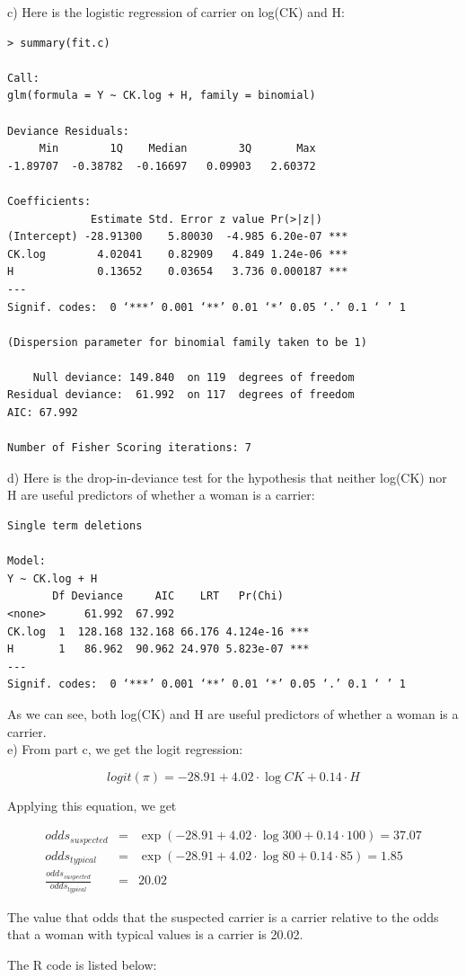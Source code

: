 \documentclass[12pt]{article}
\begin{document}
c) Here is the logistic regression of carrier on log(CK) and H:

\begin{verbatim}
> summary(fit.c)

Call:
glm(formula = Y ~ CK.log + H, family = binomial)

Deviance Residuals: 
     Min        1Q    Median        3Q       Max  
-1.89707  -0.38782  -0.16697   0.09903   2.60372  

Coefficients:
             Estimate Std. Error z value Pr(>|z|)    
(Intercept) -28.91300    5.80030  -4.985 6.20e-07 ***
CK.log        4.02041    0.82909   4.849 1.24e-06 ***
H             0.13652    0.03654   3.736 0.000187 ***
---
Signif. codes:  0 ‘***’ 0.001 ‘**’ 0.01 ‘*’ 0.05 ‘.’ 0.1 ‘ ’ 1 

(Dispersion parameter for binomial family taken to be 1)

    Null deviance: 149.840  on 119  degrees of freedom
Residual deviance:  61.992  on 117  degrees of freedom
AIC: 67.992

Number of Fisher Scoring iterations: 7
\end{verbatim}

d) Here is the drop-in-deviance test for the hypothesis that neither
log(CK) nor H are useful predictors of whether a woman is a carrier:

\begin{verbatim}
Single term deletions

Model:
Y ~ CK.log + H
       Df Deviance     AIC    LRT   Pr(Chi)    
<none>      61.992  67.992                     
CK.log  1  128.168 132.168 66.176 4.124e-16 ***
H       1   86.962  90.962 24.970 5.823e-07 ***
---
Signif. codes:  0 ‘***’ 0.001 ‘**’ 0.01 ‘*’ 0.05 ‘.’ 0.1 ‘ ’ 1 
\end{verbatim}

As we can see, both log(CK) and H are useful predictors of whether a
woman is a carrier. \\

e) From part c, we get the logit regression:

\begin{equation}
logit(\pi) = -28.91 + 4.02 \cdot \log {CK} + 0.14 \cdot H
\end{equation}

Applying this equation, we get

\begin{eqnarray*}
odds_{suspected} &=& \exp(-28.91 + 4.02 \cdot \log {300} + 0.14 \cdot
100) = 37.07 \\ 
odds_{typical} &=& \exp(-28.91 + 4.02 \cdot \log {80} + 0.14 \cdot 85)
= 1.85 \\
\frac {odds_{suspected}}{odds_{typical}} &=& 20.02
\end{eqnarray*}

The value that odds that the suspected carrier is a carrier relative
to the odds that a woman with typical values is a carrier is 20.02.

\appendix
\appendixpage
\addappheadtotoc

The R code is listed below:


\end{document}
